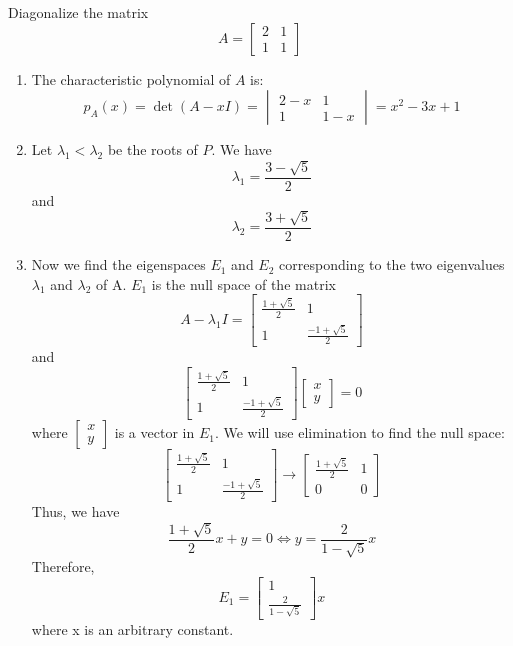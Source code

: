 Diagonalize the matrix
\[
A=\begin{bmatrix}
2 & 1 \\
1 & 1
\end{bmatrix}
\]
\begin{enumerate}
    \item The characteristic polynomial of \(A\) is:\newline
    \[p_{A}(x) = \operatorname{det}(A-x I) = 
    \begin{vmatrix}
2 - x & 1 \\
1 & 1 - x   
    \end{vmatrix} =x^2 - 3x +1 \]

    \item Let \(\lambda_{1}<\lambda_{2}\) be the roots of \(P\). We have \newline
    \[\lambda_{1} = \frac{3- \sqrt{5}}{2}\] and \[ \lambda_{2} = \frac{3+ \sqrt{5}}{2}\]


    \item Now we find the eigenspaces \(E_1\) and \(E_2\) corresponding to the two eigenvalues \(\lambda_1\) and \(\lambda_2\) of A. \newline
    \(E_1\) is the null space of the matrix 
    \[ A - \lambda_{1} I = 
    \begin{bmatrix}
    \frac{1 + \sqrt{5}}{2} & 1 \\
    1 & \frac{-1+ \sqrt{5}}{2}
    \end{bmatrix}
    \] 
    and
    \[\begin{bmatrix}
    \frac{1 + \sqrt{5}}{2} & 1 \\
    1 & \frac{-1+ \sqrt{5}}{2}
    \end{bmatrix}
    \begin{bmatrix}
    x \\
    y
    \end{bmatrix} = 0
    \] where \(\begin{bmatrix} x \\ y \end{bmatrix} \) is a vector in \(E_1\). We will use elimination to find the null space: 
    \[ \begin{bmatrix}
    \frac{1 + \sqrt{5}}{2} & 1 \\
    1 & \frac{-1+ \sqrt{5}}{2}
    \end{bmatrix} 
    \rightarrow 
    \begin{bmatrix}
    \frac{1 + \sqrt{5}}{2} & 1 \\
    0 & 0
    \end{bmatrix}
    \]
    Thus, we have \[\frac{1 + \sqrt{5}}{2}x + y = 0 \iff y = \frac{2}{1 - \sqrt{5}}x \]
    Therefore, 
    \[E_1 = 
    \begin{bmatrix}
    1 \\
    \frac{2}{1 - \sqrt{5}}
    \end{bmatrix}x \]where x is an arbitrary constant. 
    

\end{enumerate}
